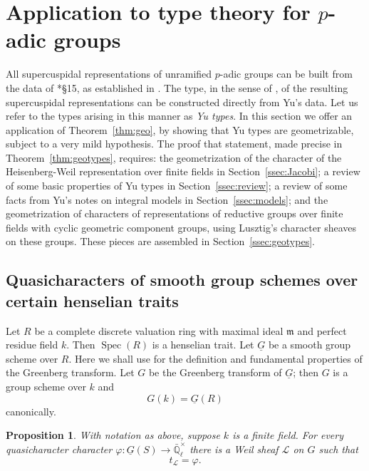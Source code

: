 \documentclass[10pt]{amsart}
\theoremstyle{plain}
\newtheorem{proposition}[theorem]{Proposition}
\theoremstyle{definition}
\newcommand{\EE}{\mathbb{\bar Q}_\ell}
\newcommand{\Fq}{k}
\newcommand{\EEx}{\EE^\times}
\newcommand{\Spec}[1]{{\operatorname{Spec}(#1)}}
\newcommand{\trFrob}[1]{t_{#1}}
\newcommand{\cs}[1]{{\mathcal{#1}}}
\begin{document}
\section{Application to type theory for \texorpdfstring{$p$}{p}-adic groups}\label{sec:types}

All supercuspidal representations of unramified $p$-adic groups can be built from the data of \cite{yu:01a}*{\S 15}, as established in \cite{kim:07a}.
The type, in the sense of \cite{bushnell-kutzko:98a}, of the resulting supercuspidal representations can be constructed directly from Yu's data. 
Let us refer to the types arising in this manner as {\it Yu types}.
In this section we offer an application of Theorem~\ref{thm:geo}, by showing that Yu types are geometrizable, subject to a very mild hypothesis.
The proof that statement, made precise in Theorem~\ref{thm:geotypes}, requires: the geometrization of the character of the Heisenberg-Weil representation over finite fields in Section~\ref{ssec:Jacobi}; a review of some basic properties of Yu types in Section~\ref{ssec:review}; a review of some facts from Yu's notes on integral models in Section~\ref{ssec:models}; and the geometrization of characters of representations of reductive groups over finite fields with cyclic geometric component groups, using Lusztig's character sheaves on these groups. These pieces are assembled in Section~\ref{ssec:geotypes}. 


\subsection{Quasicharacters of smooth group schemes over certain henselian traits}


Let $R$ be a complete discrete valuation ring with maximal ideal $\mathfrak{m}$ and perfect residue field $\Fq$. 
Then $\Spec{R}$ is a henselian trait.
Let $\underline{G}$ be a smooth group scheme over $R$.
Here we shall use  \cite{bertapelle-gonzales:Greenberg} for the definition and fundamental properties of the Greenberg transform.
Let $G$ be the Greenberg transform of $\underline{G}$; then $G$ is a group scheme over $\Fq$ and 
\[
G(\Fq) = \underline{G}(R)
\]
canonically.

\begin{proposition}\label{prop:quasicharacters}
With notation as above, suppose $\Fq$ is a finite field.
For every quasicharacter character $\varphi : \underline{G}(S) \to \EEx$ there is a Weil sheaf $\cs{L}$ on $G$ such that \[\trFrob{\cs{L}} =  \varphi.\] \end{proposition}
\end{document}

